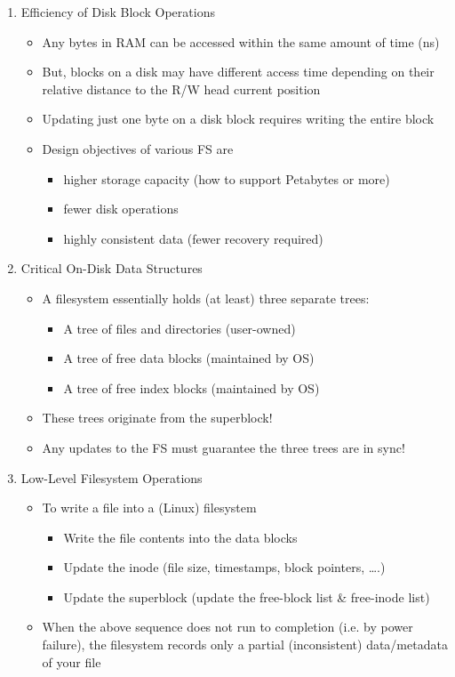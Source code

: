 \documentclass[11pt]{article}
\begin{document}
\begin{enumerate}
\item Efficiency of Disk Block Operations
	\begin{itemize}
  	\item Any bytes in RAM can be accessed within the same amount of time (ns)
  	\item But, blocks on a disk may have different access time depending on their relative distance to the R/W head current position
  	\item Updating just one byte on a disk block requires writing the entire block
  	\item Design objectives of various FS are
  		\begin{itemize}
  		\item higher storage capacity (how to support Petabytes or more)
  		\item fewer disk operations
  		\item highly consistent data (fewer recovery required)
  		\end{itemize}
  	\end{itemize}

\item Critical On-Disk Data Structures
	\begin{itemize}
  	\item A filesystem essentially holds (at least) three separate trees:
  		\begin{itemize}
  		\item A tree of files and directories (user-owned)
  		\item A tree of free data blocks (maintained by OS)
  		\item A tree of free index blocks (maintained by OS)
  		\end{itemize}
  	\item These trees originate from the superblock!
  	\item Any updates to the FS must guarantee the three trees are in sync!
  	\end{itemize}
	
\item Low-Level Filesystem Operations
	\begin{itemize}
  	\item To write a file into a (Linux) filesystem
  		\begin{itemize}
  		\item Write the file contents into the data blocks
  		\item Update the inode (file size, timestamps, block pointers, ….)
  		\item Update the superblock (update the free-block list & free-inode list)
  		\end{itemize}
  	\item When the above sequence does not run to completion (i.e. by power failure), the filesystem records only a partial (inconsistent) data/metadata of your file
  	\end{itemize}


\end{enumerate}
\end{document}
